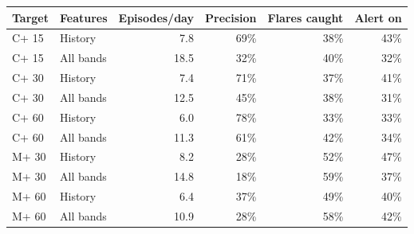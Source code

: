\begin{tabular}{llrrrr}
\toprule
Target & Features & Episodes/day & Precision & Flares caught & Alert on \\
\midrule
C+ 15 & History & 7.8 & 69\% & 38\% & 43\% \\
C+ 15 & All bands & 18.5 & 32\% & 40\% & 32\% \\
C+ 30 & History & 7.4 & 71\% & 37\% & 41\% \\
C+ 30 & All bands & 12.5 & 45\% & 38\% & 31\% \\
C+ 60 & History & 6.0 & 78\% & 33\% & 33\% \\
C+ 60 & All bands & 11.3 & 61\% & 42\% & 34\% \\
M+ 30 & History & 8.2 & 28\% & 52\% & 47\% \\
M+ 30 & All bands & 14.8 & 18\% & 59\% & 37\% \\
M+ 60 & History & 6.4 & 37\% & 49\% & 40\% \\
M+ 60 & All bands & 10.9 & 28\% & 58\% & 42\% \\
\bottomrule
\end{tabular}
